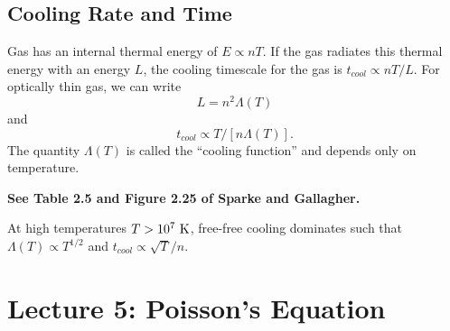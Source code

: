 \documentclass[]{article}
\begin{document}
\subsection{Cooling Rate and Time}

Gas has an internal thermal energy of $E \propto nT$. If the gas radiates this thermal energy with an energy $L$, the
cooling timescale for the gas is $t_{cool} \propto nT/L$. For optically thin gas, we can write
\begin{equation}
L = n^{2} \Lambda(T)
\end{equation}
\noindent
and
\begin{equation}
t_{cool}  \propto T/[n\Lambda(T)].
\end{equation}
The quantity $\Lambda(T)$ is called the ``cooling function'' and depends only on temperature.

{\bf See Table 2.5 and Figure 2.25 of Sparke and Gallagher.}

At high temperatures $T>10^{7}~\mathrm{K}$, free-free cooling dominates such that $\Lambda(T) \propto T^{1/2}$
and $t_{cool} \propto \sqrt{T}/n$.



\section{Lecture 5: Poisson's Equation}
\end{document}
